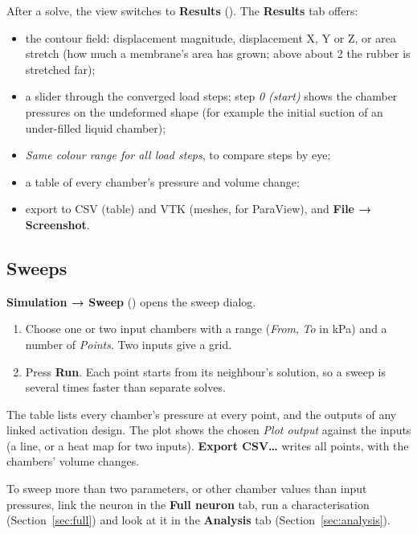\documentclass[11pt,a4paper]{article}
\newcommand{\menu}[1]{\textsf{\textbf{#1}}}
\newcommand{\key}[1]{\fbox{\footnotesize\textsf{#1}}}
\begin{document}
After a solve, the view switches to \menu{Results} (\key{3}). The \menu{Results} tab offers:
\begin{itemize}
\item the contour field: displacement magnitude, displacement X, Y or Z, or area stretch (how much a membrane's area
  has grown; above about 2 the rubber is stretched far);
\item a slider through the converged load steps; step \emph{0 (start)} shows the chamber pressures on the undeformed
  shape (for example the initial suction of an under-filled liquid chamber);
\item \emph{Same colour range for all load steps}, to compare steps by eye;
\item a table of every chamber's pressure and volume change;
\item export to CSV (table) and VTK (meshes, for ParaView), and \menu{File → Screenshot}.
\end{itemize}

\subsection{Sweeps}
\label{sec:sweep}

\menu{Simulation → Sweep} (\key{F6}) opens the sweep dialog.

\begin{enumerate}
\item Choose one or two input chambers with a range (\emph{From}, \emph{To} in kPa) and a number of
  \emph{Points}. Two inputs give a grid.
\item Press \menu{Run}. Each point starts from its neighbour's solution, so a sweep is several times faster than
  separate solves.
\end{enumerate}
The table lists every chamber's pressure at every point, and the outputs of any linked activation design. The plot
shows the chosen \emph{Plot output} against the inputs (a line, or a heat map for two inputs). \menu{Export CSV…}
writes all points, with the chambers' volume changes.

\begin{tip}
To sweep more than two parameters, or other chamber values than input pressures, link the neuron in the
\menu{Full neuron} tab, run a characterisation (Section~\ref{sec:full}) and look at it in the \menu{Analysis} tab
(Section~\ref{sec:analysis}).
\end{tip}

\end{document}
